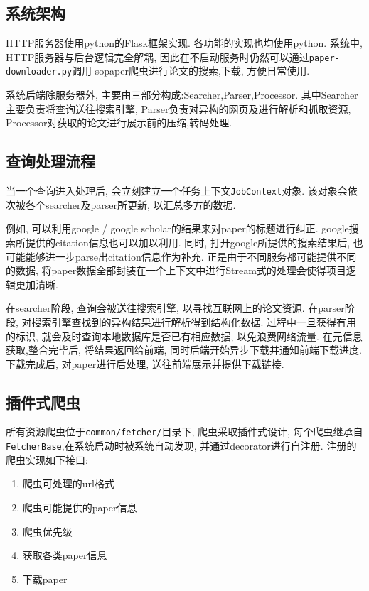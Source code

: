 \subsection{系统架构}
HTTP服务器使用python的Flask框架实现.
各功能的实现也均使用python.
系统中, HTTP服务器与后台逻辑完全解耦, 因此在不启动服务时仍然可以通过\verb|paper-downloader.py|调用
sopaper爬虫进行论文的搜索,下载, 方便日常使用.

系统后端除服务器外, 主要由三部分构成:Searcher,Parser,Processor.
其中Searcher主要负责将查询送往搜索引擎,
Parser负责对异构的网页及进行解析和抓取资源,
Processor对获取的论文进行展示前的压缩,转码处理.

\subsection{查询处理流程}

当一个查询进入处理后, 会立刻建立一个任务上下文\verb|JobContext|对象.
该对象会依次被各个searcher及parser所更新, 以汇总多方的数据.

例如, 可以利用google / google scholar的结果来对paper的标题进行纠正.
google搜索所提供的citation信息也可以加以利用. 同时, 打开google所提供的搜索结果后,
也可能能够进一步parse出citation信息作为补充.
正是由于不同服务都可能提供不同的数据, 将paper数据全部封装在一个上下文中进行Stream式的处理会使得项目逻辑更加清晰.

在searcher阶段, 查询会被送往搜索引擎, 以寻找互联网上的论文资源. 在parser阶段,
对搜索引擎查找到的异构结果进行解析得到结构化数据.
过程中一旦获得有用的标识, 就会及时查询本地数据库是否已有相应数据, 以免浪费网络流量.
在元信息获取,整合完毕后, 将结果返回给前端, 同时后端开始异步下载并通知前端下载进度.
下载完成后, 对paper进行后处理, 送往前端展示并提供下载链接.

\subsection{插件式爬虫}

所有资源爬虫位于\verb|common/fetcher/|目录下, 爬虫采取插件式设计,
每个爬虫继承自\verb|FetcherBase|,在系统启动时被系统自动发现,
并通过decorator进行自注册.
注册的爬虫实现如下接口:
\begin{enumerate}
  \item 爬虫可处理的url格式
  \item 爬虫可能提供的paper信息
  \item 爬虫优先级
  \item 获取各类paper信息
  \item 下载paper
\end{enumerate}

